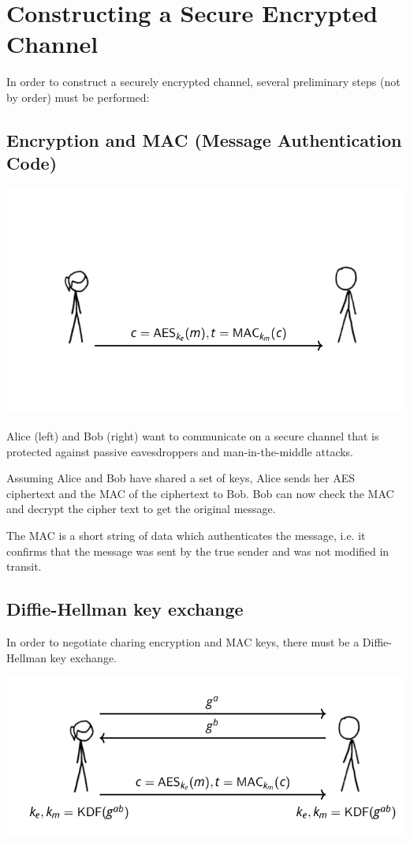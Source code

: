 \documentclass[11pt]{article} %
\begin{document}
\section{Constructing a Secure Encrypted Channel}
In order to construct a securely encrypted channel, several preliminary
steps (not by order) must be performed:

\subsection{Encryption and MAC (Message Authentication Code)}

\begin{center}
	\includegraphics[scale=.7]{./tls1.png}
\end{center}

{\parindent0pt Alice (left) and Bob (right) want to communicate on a secure 
channel that is protected against passive eavesdroppers and man-in-the-middle
attacks.}

\bigskip
{\parindent0pt Assuming Alice and Bob have shared a set of keys, Alice sends her
AES ciphertext and the MAC of the ciphertext to Bob.  Bob can now check the MAC
and decrypt the cipher text to get the original message.}

\bigskip
{\parindent0pt The MAC is a short string of data which authenticates the message, i.e. it
confirms that the message was sent by the true sender and was not modified in transit.}

\subsection{Diffie-Hellman key exchange}
In order to negotiate charing encryption and MAC keys, there must be a
Diffie-Hellman key exchange.

\begin{center}
	\includegraphics[scale=.7]{./tls2.png}
\end{center}
\end{document}
